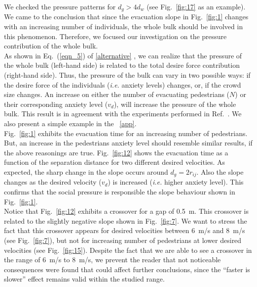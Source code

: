 We checked the pressure patterns for $d_g>4d_w$ (see Fig.~\ref{fig:17} as an 
example). We came to the conclusion that since the evacuation slope in 
Fig.~\ref{fig:1} changes with an increasing number of individuals, the whole 
bulk should be involved in this phenomenon. Therefore, we focused our 
investigation on the pressure contribution of the whole bulk.  \\ 

As shown in Eq.~(\ref{eqn_5}) of \ref{alternative} , we can realize that the pressure of the 
whole bulk (left-hand side) is related to the total desire force contribution 
(right-hand side). Thus, the pressure of the bulk can vary in two possible 
ways: if the desire force of the individuals (\emph{i.e.} anxiety levels) 
changes, or, if the crowd size changes. An increase on either 
the number of evacuating pedestrians ($N$) or their corresponding anxiety 
level ($v_d$), will increase the pressure of the whole bulk. This result is in agreement with the experiments performed in Ref.~\cite{Pastor}.
We also present a simple example in the ~\ref{app}. \\

Fig.~\ref{fig:1} exhibits the evacuation time for an increasing number of 
pedestrians. But, an increase in the pedestrians anxiety level should  
resemble similar results, if the above reasonings are true. Fig.~\ref{fig:12} 
shows the evacuation time as a function of the separation distance for two 
different desired velocities. As expected, the sharp change in the slope occurs 
around $d_g=2r_{ij}$. Also the slope changes as the desired velocity ($v_d$) is 
increased (\emph{i.e.} higher anxiety level). This confirms that the social 
pressure is responsible the slope behaviour shown in Fig.~\ref{fig:1}. \\

Notice that Fig.~\ref{fig:12} exhibits a crossover for a gap of 0.5~m. This crossover is related to the slightly negative slope shown in Fig.~\ref{fig:7}. We want to stress the fact that this crossover appears for desired velocities between 6~m/s and 8~m/s (see  Fig.~\ref{fig:7}), but not for increasing number of pedestrians at lower desired velocities (see Fig.~\ref{fig:15}). Despite the fact that we are able to see a crossover in the range of 6~m/s to 8~m/s, we prevent the reader that not noticeable consequences were found that could affect further conclusions, since the ``faster is slower'' effect remains valid within the studied range.\\


